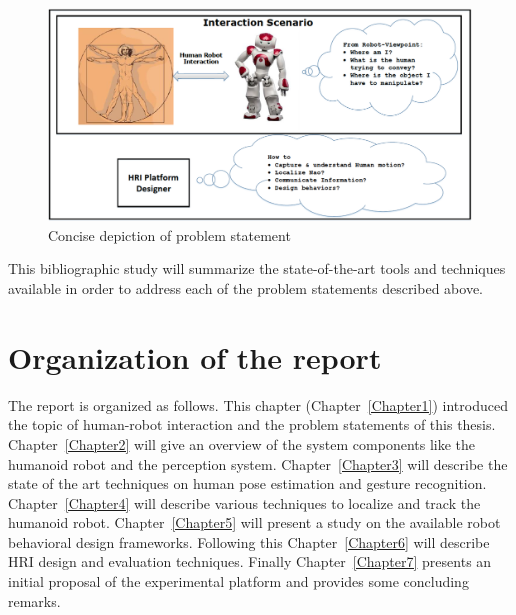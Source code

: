 \begin{figure}[H]
\centering
\includegraphics[width=\textwidth]{assets/ProblemStatement.png}
\caption{Concise depiction of problem statement}
\label{fig:problemstatement}
\end{figure}%

	This bibliographic study will summarize the state-of-the-art tools and techniques available in order to address each of the problem statements described above.

\section{Organization of the report}
	The report is organized as follows. This chapter (Chapter~\ref{Chapter1}) introduced the topic of human-robot interaction and the problem statements of this thesis. Chapter~\ref{Chapter2} will give an overview of the system components like the humanoid robot and the perception system. Chapter~\ref{Chapter3} will describe the state of the art techniques on human pose estimation and gesture recognition. Chapter~\ref{Chapter4} will describe various techniques to localize and track the humanoid robot. Chapter~\ref{Chapter5} will present a study on the available robot behavioral design frameworks. Following this Chapter~\ref{Chapter6} will describe HRI design and evaluation techniques. Finally Chapter~\ref{Chapter7} presents an initial proposal of the experimental platform and provides some concluding remarks.